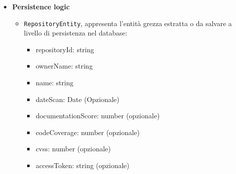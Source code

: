 \documentclass[a4paper, 11pt]{article}
\newcounter{subsubsubsection}[subsubsection]
\newcounter{subsubsubsubsection}[subsubsubsection]
\begin{document}
\begin{itemize}
\begin{itemize}
      \item \texttt{RepositoryScores}: rappresenta i punteggi e le metriche di qualità elaborati e passati a livello di service per l'aggiornamento storico:
      \begin{itemize}
          \item dateScan: Date (Opzionale)
          \item documentationScore: number (opzionale)
          \item codeCoverage: number (opzionale)
          \item cvss: number (opzionale)
      \end{itemize}
    \end{itemize}

  \item \textbf{Persistence logic}
  \begin{itemize}
    \item \texttt{RepositoryEntity}, appresenta l'entità grezza estratta o da salvare a livello di persistenza nel database:
    \begin{itemize}
          \item repositoryId: string 
          \item ownerName: string 
          \item name: string 
          \item dateScan: Date (Opzionale)
          \item documentationScore: number (opzionale)
          \item codeCoverage: number (opzionale)
          \item cvss: number (opzionale)
          \item accessToken: string (opzionale)
      \end{itemize}
  \end{itemize}
\end{itemize}

\end{document}
